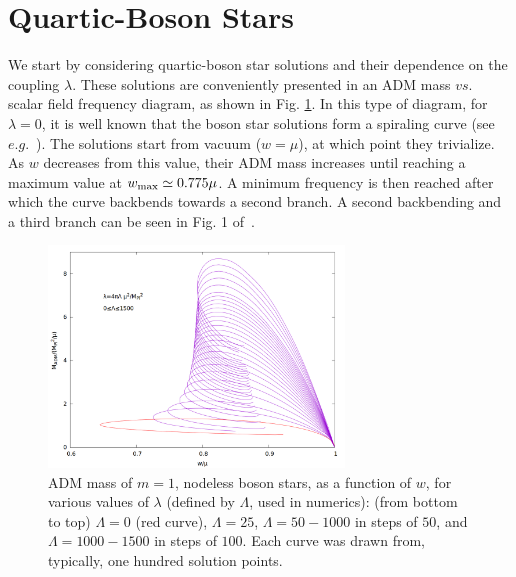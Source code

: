 \section{Quartic-Boson Stars}
\label{sec_II}
We start by considering quartic-boson star solutions and their dependence on the coupling $\lambda$. These solutions are  conveniently presented in an ADM mass $vs.$ scalar field frequency diagram, as shown in Fig. \ref{fig:w-vs-M-BSs}. In this type of diagram, for $\lambda=0$, it is well known that the boson star solutions form a spiraling curve (see $e.g.$~\cite{Herdeiro:2015gia}). The solutions start from vacuum ($w=\mu$), at which point they trivialize. As $w$ decreases from this value, their ADM mass increases until reaching a maximum value at $w_{\rm max}\simeq 0.775 \mu$. A minimum frequency is then reached after which the curve backbends towards a second branch. A second backbending and a third branch can be seen in  Fig. 1 of~\cite{Herdeiro:2015gia}.

\begin{figure}[h!]
  \begin{center}
    \includegraphics[width=0.7\textwidth]{papers/selfInteractions/w-vs-M-BSs2.png}
  \end{center}
  \caption{ADM mass of $m=1$, nodeless boson stars, as a function of $w$, for various values of $\lambda$ (defined by $\Lambda$, used in numerics): (from bottom to top) $\Lambda=0$ (red curve), $\Lambda=25$, $\Lambda=50-1000$ in steps of $50$, and $\Lambda=1000-1500$ in steps of $100$. Each curve was drawn from, typically, one hundred solution points.}
  \label{fig:w-vs-M-BSs}
\end{figure}



